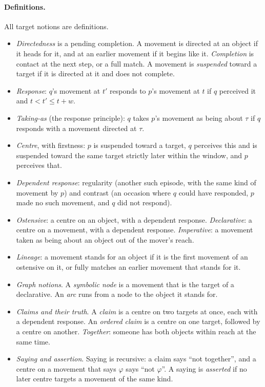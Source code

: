\documentclass[11pt]{article}
\begin{document}
\paragraph{Definitions.}
All target notions are definitions.
\begin{itemize}
  \item \emph{Directedness} is a pending completion. A movement is directed at an object
    if it heads for it, and at an earlier movement if it begins like it. \emph{Completion}
    is contact at the next step, or a full match. A movement is \emph{suspended} toward a
    target if it is directed at it and does not complete.
  \item \emph{Response}: $q$'s movement at $t'$ responds to $p$'s movement at $t$ if $q$
    perceived it and $t < t' \le t + w$.
  \item \emph{Taking-as} (the response principle): $q$ takes $p$'s movement as being about
    $\tau$ if $q$ responds with a movement directed at $\tau$.
  \item \emph{Centre}, with firstness: $p$ is suspended toward a target, $q$ perceives
    this and is suspended toward the same target strictly later within the window, and
    $p$ perceives that.
  \item \emph{Dependent response}: regularity (another such episode, with the same kind of
    movement by $p$) and contrast (an occasion where $q$ could have responded, $p$ made no
    such movement, and $q$ did not respond).
  \item \emph{Ostensive}: a centre on an object, with a dependent response.
    \emph{Declarative}: a centre on a movement, with a dependent response.
    \emph{Imperative}: a movement taken as being about an object out of the mover's reach.
  \item \emph{Lineage}: a movement stands for an object if it is the first movement of an
    ostensive on it, or fully matches an earlier movement that stands for it.
  \item \emph{Graph notions}. A \emph{symbolic node} is a movement that is the target of a
    declarative. An \emph{arc} runs from a node to the object it stands for.
  \item \emph{Claims and their truth}. A \emph{claim} is a centre on two targets at once,
    each with a dependent response. An \emph{ordered claim} is a centre on one target,
    followed by a centre on another. \emph{Together}: someone has both objects within
    reach at the same time.
  \item \emph{Saying and assertion}. Saying is recursive: a claim says ``not together'',
    and a centre on a movement that says $\varphi$ says ``not $\varphi$''. A saying is
    \emph{asserted} if no later centre targets a movement of the same kind.
\end{itemize}
\end{document}
